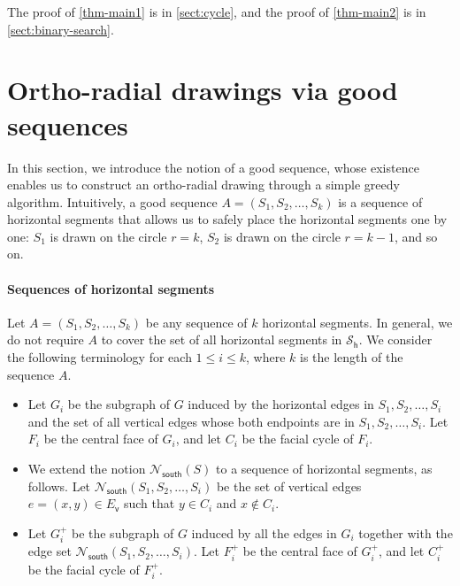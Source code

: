 \documentclass{article}\usepackage[a4paper,margin=20mm]{geometry}
\makeatletter
\newtheorem{theorem}{Theorem}\newtheorem{lemma}[theorem]{Lemma}\newtheorem{proposition}[theorem]{Proposition}\newtheorem{corollary}[theorem]{Corollary}\newtheorem{definition}[theorem]{Definition}\newtheorem{claim}[theorem]{Claim}\newtheorem{remark}[theorem]{Remark}\newtheorem{observation}[theorem]{Observation}\newtheorem{conjecture}[theorem]{Conjecture}\newtheorem{example}[theorem]{Example}
\newcommand{\RR}{\mathcal{R}}
\newcommand{\EV}{E_\mathsf{v}}
\newcommand{\PH}{\mathcal{S}_\mathsf{h}}
\newcommand{\Nsouth}{\mathcal{N}_\mathsf{south}}
\newcommand\IfRestateTF{%
  \ifx\label\thmt@gobble@label %
    \expandafter\@firstoftwo
  \else
    \expandafter\@secondoftwo
  \fi
}
\newcommand{\RestateRemark}{\IfRestateTF{{\normalfont\bfseries (Restated) }}{}}
\makeatother
\begin{document}




The proof of \cref{thm-main1} is in \cref{sect:cycle}, and the proof of \cref{thm-main2} is in \cref{sect:binary-search}. 

\section{Ortho-radial drawings via good sequences}\label{sect:drawing}

In this section, we introduce the notion of a good sequence, whose existence enables us to construct an ortho-radial drawing through a simple greedy algorithm. Intuitively, a good sequence $A = (S_1, S_2, \ldots, S_{k})$ is a sequence of horizontal segments that allows us to safely place the horizontal segments one by one: $S_1$ is drawn on the circle $r=k$, $S_2$ is drawn on the circle $r = k-1$, and so on.  


\paragraph{Sequences of horizontal segments} Let $A = (S_1, S_2, \ldots, S_{k})$ be any sequence of $k$ horizontal segments. In general, we do not require $A$ to cover the set of all horizontal segments in $\PH$. We consider the following terminology for each $1 \leq i \leq k$, where $k$ is the length of the sequence $A$.
\begin{itemize}
    \item Let $G_i$ be the subgraph of $G$ induced by the horizontal edges in $S_1, S_2, \ldots, S_{i}$ and the set of all vertical edges whose both endpoints are in $S_1, S_2, \ldots, S_{i}$.
 Let $F_i$ be the central face of $G_i$, and let $C_i$ be the facial cycle of $F_i$.
    \item We extend the notion $\Nsouth(S)$ to a sequence of horizontal segments, as follows. Let $\Nsouth(S_1, S_2, \ldots, S_{i})$ be the set of vertical edges $e = (x,y) \in \EV$ such that $y \in C_i$ and $x \notin C_i$. 
    \item Let $G_i^+$ be the subgraph of $G$ induced by all the edges in $G_i$ together with the edge set $\Nsouth(S_1, S_2, \ldots, S_{i})$. Let $F_i^+$ be the central face of $G_i^+$, and let $C_i^+$ be the facial cycle of $F_i^+$.
\end{itemize}
\end{document}
